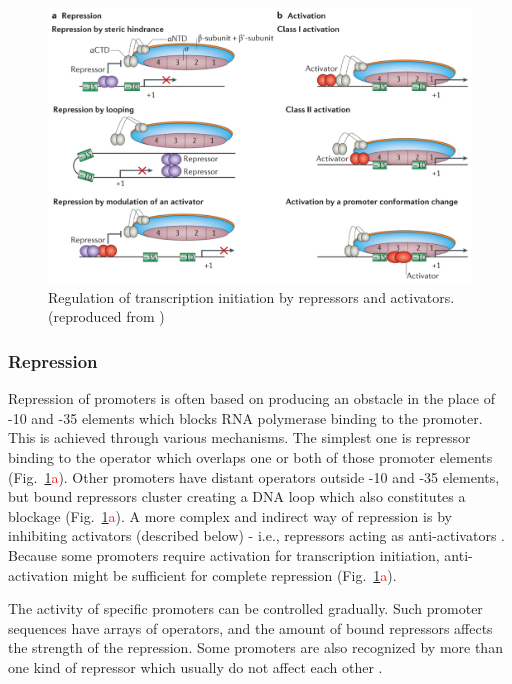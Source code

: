 \begin{figure}[ht!]
  \centering
  \includegraphics[scale=0.4]{text/Pictures/TxnInitRegulation.png}
    \caption{Regulation of transcription initiation by repressors and activators. (reproduced from \cite{browning2016local})}
    \label{txn}
\end{figure}

\subsubsection{Repression}
Repression of promoters is often based on producing an obstacle in the place of -10 and -35 elements which blocks RNA polymerase binding to the promoter.
This is achieved through various mechanisms.
The simplest one is repressor binding to the operator which overlaps one or both of those promoter elements \cite{brent1981mechanism} (Fig.~\ref{txn}\textcolor{red}{a}).
Other promoters have distant operators outside -10 and -35 elements, but bound repressors cluster creating a DNA loop which also constitutes a blockage \cite{semsey2004dna} (Fig.~\ref{txn}\textcolor{red}{a}).
A more complex and indirect way of repression is by inhibiting activators (described below) - i.e., repressors acting as anti-activators \cite{sogaard1993protein}.
Because some promoters require activation for transcription initiation, anti-activation might be sufficient for complete repression (Fig.~\ref{txn}\textcolor{red}{a}).

The activity of specific promoters can be controlled gradually.
Such promoter sequences have arrays of operators, and the amount of bound repressors affects the strength of the repression.
Some promoters are also recognized by more than one kind of repressor which usually do not affect each other \cite{el2009repression}.

